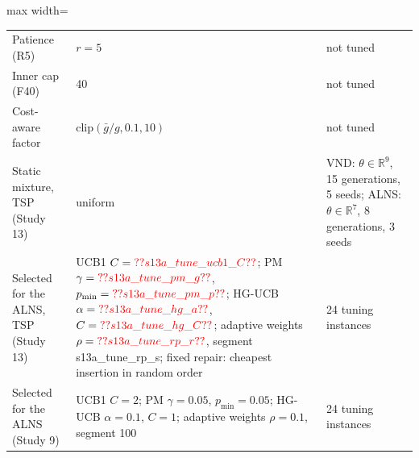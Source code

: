 \begin{table}[h]
\begin{adjustbox}{max width=\linewidth}
\begin{tabular}{lll}
Patience (R5) & $r=5$ & not tuned \\
Inner cap (F40) & 40 & not tuned \\
Cost-aware factor & $\mathrm{clip}(\bar g/g,0.1,10)$ & not tuned \\
Static mixture, TSP (Study 13) & uniform & VND: $\theta\in\mathbb{R}^{9}$, 15 generations, 5 seeds; ALNS: $\theta\in\mathbb{R}^{7}$, 8 generations, 3 seeds \\
Selected for the ALNS, TSP (Study 13) & UCB1 $C=\num{s13a_tune_ucb1_C}$; PM $\gamma=\num{s13a_tune_pm_g}$, $p_{\min}=\num{s13a_tune_pm_p}$; HG-UCB $\alpha=\num{s13a_tune_hg_a}$, $C=\num{s13a_tune_hg_C}$; adaptive weights $\rho=\num{s13a_tune_rp_r}$, segment \num{s13a_tune_rp_s}; fixed repair: cheapest insertion in random order & 24 tuning instances \\
Selected for the ALNS (Study 9) & UCB1 $C=2$; PM $\gamma=0.05$, $p_{\min}=0.05$; HG-UCB $\alpha=0.1$, $C=1$; adaptive weights $\rho=0.1$, segment 100 & 24 tuning instances \\
\bottomrule
\end{tabular}
\end{adjustbox}
\end{table}
